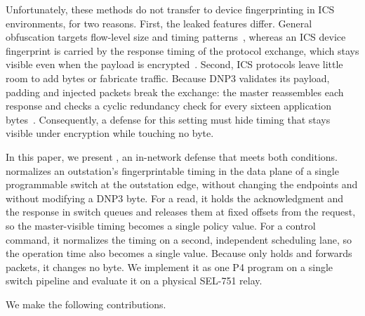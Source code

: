 Unfortunately, these methods do not transfer to device fingerprinting in ICS environments, for two
reasons. First, the leaked features differ. General obfuscation targets flow-level size and timing
patterns~\cite{meierDittoWANTraffic2022}, whereas an ICS device fingerprint is carried by the response timing of the
protocol exchange, which stays visible even when the payload is encrypted~\cite{formbyWhosControlYour2016}. Second, ICS
protocols leave little room to add bytes or fabricate traffic. Because DNP3 validates its payload,
padding and injected packets break the exchange: the master reassembles each response and checks a
cyclic redundancy check for every sixteen application bytes~\cite{ieeeIEEEStandardElectric2012}. Consequently, a defense for
this setting must hide timing that stays visible under encryption while touching no byte.

In this paper, we present \sysname, an in-network defense that meets both conditions. \sysname
normalizes an outstation's fingerprintable timing in the data plane of a single programmable switch at
the outstation edge, without changing the endpoints and without modifying a DNP3 byte. For a read, it
holds the acknowledgment and the response in switch queues and releases them at fixed offsets from the
request, so the master-visible timing becomes a single policy value. For a control command, it
normalizes the timing on a second, independent scheduling lane, so the operation time also becomes a
single value. Because \sysname only holds and forwards packets, it changes no byte. We implement it as
one P4 program on a single switch pipeline and evaluate it on a physical SEL-751 relay.

We make the following contributions.

